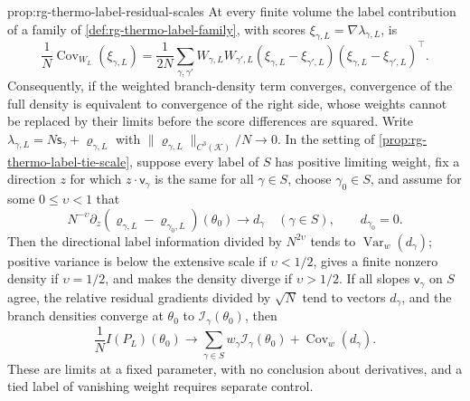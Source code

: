 {prop:rg-thermo-label-residual-scales}
At every finite volume the label contribution of a family of
\cref{def:rg-thermo-label-family}, with scores
$\xi_{\gamma,L}=\nabla\lambda_{\gamma,L}$, is
\begin{equation}
 \frac1N\operatorname{Cov}_{W_L}(\xi_{\gamma,L})
 =\frac1{2N}\sum_{\gamma,\gamma'}W_{\gamma,L}W_{\gamma',L}
   (\xi_{\gamma,L}-\xi_{\gamma',L})
   (\xi_{\gamma,L}-\xi_{\gamma',L})^\top.
 \label{eq:rg-thermo-label-pairwise-covariance}
\end{equation}
Consequently, if the weighted branch-density term converges, convergence of
the full density is equivalent to convergence of the right side, whose
weights cannot be replaced by their limits before the score differences are
squared. Write $\lambda_{\gamma,L}=N\mathsf s_\gamma+\varrho_{\gamma,L}$ with
$\|\varrho_{\gamma,L}\|_{C^3(\mathcal K)}/N\to0$. In the setting of
\cref{prop:rg-thermo-label-tie-scale}, suppose every label of $S$ has positive
limiting weight, fix a direction $z$ for which $z\cdot\mathsf v_\gamma$ is the
same for all $\gamma\in S$, choose $\gamma_0\in S$, and assume for some
$0\leq\upsilon<1$ that
\begin{equation}
 N^{-\upsilon}\partial_z(\varrho_{\gamma,L}-\varrho_{\gamma_0,L})(\theta_0)
 \longrightarrow d_\gamma\quad(\gamma\in S),
 \qquad d_{\gamma_0}=0.
 \label{eq:rg-thermo-label-residual-assumption}
\end{equation}
Then the directional label information divided by $N^{2\upsilon}$ tends to
$\operatorname{Var}_w(d_\gamma)$; positive variance is below the extensive
scale if $\upsilon<1/2$, gives a finite nonzero density if $\upsilon=1/2$,
and makes the density diverge if $\upsilon>1/2$. If all slopes
$\mathsf v_\gamma$ on $S$ agree, the relative residual gradients divided by
$\sqrt N$ tend to vectors $d_\gamma$, and the branch densities converge at
$\theta_0$ to $\mathcal I_\gamma(\theta_0)$, then
\begin{equation}
 \frac1NI(P_L)(\theta_0)\longrightarrow
       \sum_{\gamma\in S}w_\gamma\mathcal I_\gamma(\theta_0)
                           +\operatorname{Cov}_w(d_\gamma).
 \label{eq:rg-thermo-label-residual-density}
\end{equation}
These are limits at a fixed parameter, with no conclusion about derivatives,
and a tied label of vanishing weight requires separate control.

